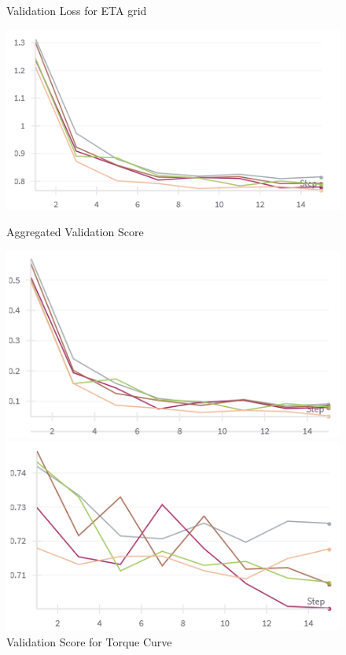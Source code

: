 \documentclass{report} %
\begin{document}
\begin{figure}[H]
\begin{minipage}[b]{0.3\textwidth}
        \caption{\centering Validation Loss for ETA grid}
        \label{fig:Validation Loss for ETA grid}
    \end{minipage}
\end{figure}

\begin{figure}[H]
    \centering
    \begin{minipage}[b]{0.3\textwidth}
        \includegraphics[width=\textwidth]{./ReportImages/val_score.png}
        \caption{\centering Aggregated Validation Score}
        \label{fig:Aggregated Validation Score}
    \end{minipage}
    \begin{minipage}[b]{0.3\textwidth}
        \includegraphics[width=\textwidth]{./ReportImages/val_score_y1.png}
        \caption{\centering Validation Score for Torque Curve}
        \label{fig:Validation Score for Torque Curve}
    \end{minipage}
    \hfill
    \begin{minipage}[b]{0.3\textwidth}
        \includegraphics[width=\textwidth]{./ReportImages/val_score_y2.png}

\end{minipage}
\end{figure}
\end{document}
